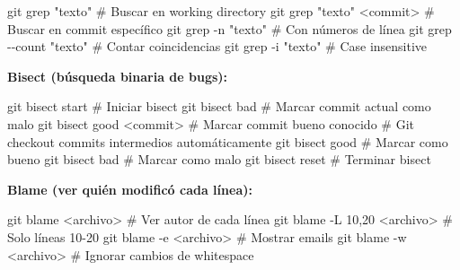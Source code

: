 \documentclass[
  doc,
  floatsintext,
  longtable,
  a4paper,
  nolmodern,
  notxfonts,
  notimes,
  12pt,
  colorlinks=true,linkcolor=blue,citecolor=blue,urlcolor=blue]{apa7}
\newenvironment{Shaded}{\begin{snugshade}}{\end{snugshade}}
\newcommand{\AttributeTok}[1]{\textcolor[rgb]{0.40,0.45,0.13}{#1}}
\newcommand{\CommentTok}[1]{\textcolor[rgb]{0.37,0.37,0.37}{#1}}
\newcommand{\FunctionTok}[1]{\textcolor[rgb]{0.28,0.35,0.67}{#1}}
\newcommand{\NormalTok}[1]{\textcolor[rgb]{0.00,0.23,0.31}{#1}}
\newcommand{\OperatorTok}[1]{\textcolor[rgb]{0.37,0.37,0.37}{#1}}
\newcommand{\StringTok}[1]{\textcolor[rgb]{0.13,0.47,0.30}{#1}}
\begin{document}
\begin{Shaded}
\begin{Highlighting}[]
\FunctionTok{git}\NormalTok{ grep }\StringTok{"texto"}           \CommentTok{\# Buscar en working directory}
\FunctionTok{git}\NormalTok{ grep }\StringTok{"texto"} \OperatorTok{\textless{}}\NormalTok{commit}\OperatorTok{\textgreater{}}  \CommentTok{\# Buscar en commit específico}
\FunctionTok{git}\NormalTok{ grep }\AttributeTok{{-}n} \StringTok{"texto"}        \CommentTok{\# Con números de línea}
\FunctionTok{git}\NormalTok{ grep }\AttributeTok{{-}{-}count} \StringTok{"texto"}   \CommentTok{\# Contar coincidencias}
\FunctionTok{git}\NormalTok{ grep }\AttributeTok{{-}i} \StringTok{"texto"}        \CommentTok{\# Case insensitive}
\end{Highlighting}
\end{Shaded}

\textbf{Bisect (búsqueda binaria de bugs):}

\begin{Shaded}
\begin{Highlighting}[]
\FunctionTok{git}\NormalTok{ bisect start           }\CommentTok{\# Iniciar bisect}
\FunctionTok{git}\NormalTok{ bisect bad             }\CommentTok{\# Marcar commit actual como malo}
\FunctionTok{git}\NormalTok{ bisect good }\OperatorTok{\textless{}}\NormalTok{commit}\OperatorTok{\textgreater{}}   \CommentTok{\# Marcar commit bueno conocido}
\CommentTok{\# Git checkout commits intermedios automáticamente}
\FunctionTok{git}\NormalTok{ bisect good            }\CommentTok{\# Marcar como bueno}
\FunctionTok{git}\NormalTok{ bisect bad             }\CommentTok{\# Marcar como malo}
\FunctionTok{git}\NormalTok{ bisect reset           }\CommentTok{\# Terminar bisect}
\end{Highlighting}
\end{Shaded}

\textbf{Blame (ver quién modificó cada línea):}

\begin{Shaded}
\begin{Highlighting}[]
\FunctionTok{git}\NormalTok{ blame }\OperatorTok{\textless{}}\NormalTok{archivo}\OperatorTok{\textgreater{}}        \CommentTok{\# Ver autor de cada línea}
\FunctionTok{git}\NormalTok{ blame }\AttributeTok{{-}L}\NormalTok{ 10,20 }\OperatorTok{\textless{}}\NormalTok{archivo}\OperatorTok{\textgreater{}}  \CommentTok{\# Solo líneas 10{-}20}
\FunctionTok{git}\NormalTok{ blame }\AttributeTok{{-}e} \OperatorTok{\textless{}}\NormalTok{archivo}\OperatorTok{\textgreater{}}     \CommentTok{\# Mostrar emails}
\FunctionTok{git}\NormalTok{ blame }\AttributeTok{{-}w} \OperatorTok{\textless{}}\NormalTok{archivo}\OperatorTok{\textgreater{}}     \CommentTok{\# Ignorar cambios de whitespace}
\end{Highlighting}
\end{Shaded}
\end{document}
